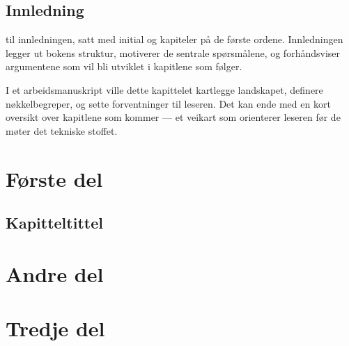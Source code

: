 \documentclass[11pt,twoside,b5paper]{book}
\begin{document}
\chapter{Innledning}
til innledningen, satt med initial og kapiteler på de første ordene. Innledningen legger ut bokens struktur, motiverer de sentrale spørsmålene, og forhåndsviser argumentene som vil bli utviklet i kapitlene som følger.

I et arbeidsmanuskript ville dette kapittelet kartlegge landskapet, definere nøkkelbegreper, og sette forventninger til leseren. Det kan ende med en kort oversikt over kapitlene som kommer --- et veikart som orienterer leseren før de møter det tekniske stoffet.


\part{Første del}

\chapter{Kapitteltittel}



\part{Andre del}


\part{Tredje del}


\backmatter




\end{document}
